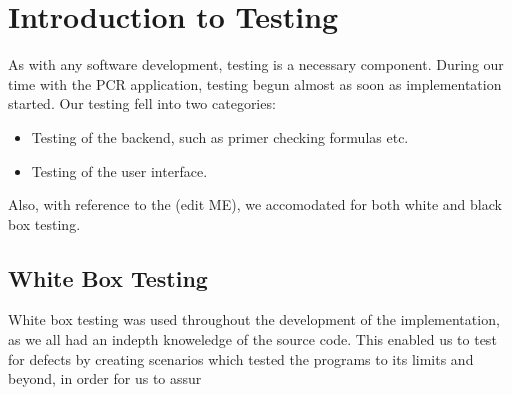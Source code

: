 %
%
%
\section{Introduction to Testing}

As with any software development, testing is a necessary component. During our time with the PCR application, testing begun
almost as soon as implementation started. Our testing fell into two categories: \\

\begin{itemize}
\item Testing of the backend, such as primer checking formulas etc.
\item Testing of the user interface.
\end{itemize}

Also, with reference to the (edit ME)\cite{Lethbridge}, we accomodated for both white and black box testing. 

\subsection{White Box Testing}
White box testing was
used throughout the development of the implementation, as we all had an indepth knoweledge of the source code. This enabled us to test
for defects by creating scenarios which tested the programs to its limits and beyond, in order for us to assur




